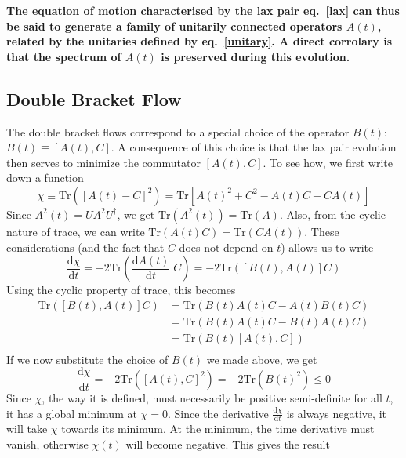 \documentclass[12pt,twoside]{article}
\numberwithin{equation}{section}
\begin{document}
{\textbf{The equation of motion characterised by the lax pair eq.~\ref{lax} can thus be said to generate a family of unitarily connected operators \(A(t)\), related by the unitaries defined by eq.~\ref{unitary}. A direct corrolary is that the spectrum of \(A(t)\) is preserved during this evolution.}
\subsection{Double Bracket Flow}
The double bracket flows correspond to a special choice of the operator \(B(t)\): \(B(t) \equiv \left[A(t), C\right]\). A consequence of this choice is that the lax pair evolution then serves to minimize the commutator \(\left[A(t), C\right]\). To see how, we first write down a function
\begin{equation}
	\label{minfunc}
	\chi \equiv \text{Tr}\left(\left[A(t) - C\right]^2\right) = \text{Tr}\left[A(t)^2 + C^2 - A(t) C - C A(t)\right]
\end{equation}
Since \(A^2(t) = U A^2 U^\dagger\), we get \(\text{Tr}(A^2(t)) = \text{Tr}(A)\). Also, from the cyclic nature of trace, we can write \(\text{Tr}(A(t)C)=\text{Tr}(CA(t))\). These considerations (and the fact that \(C\) does not depend on \(t\)) allows us to write
\begin{equation}
	\frac{\mathrm{d} \chi}{\mathrm{d}t} = -2\text{Tr}\left(\frac{\mathrm{d} A(t)}{\mathrm{d}t}\;C\right) = -2\text{Tr}\left(\left[B(t),A(t)\right] C\right)
\end{equation}
Using the cyclic property of trace, this becomes
\begin{equation}\begin{aligned}
	\text{Tr}\left(\left[B(t),A(t)\right] C\right) &= \text{Tr}\left(B(t)A(t) C - A(t) B(t)C\right)\\
						       &= \text{Tr}\left(B(t)A(t) C - B(t)A(t) C\right)\\
						       &= \text{Tr}\left(B(t)\left[A(t), C\right]\right)\\
\end{aligned}\end{equation}
If we now substitute the choice of \(B(t)\) we made above, we get
\begin{equation}
	\frac{\mathrm{d} \chi}{\mathrm{d}t} = -2\text{Tr}\left(\left[A(t), C\right]^2\right) = -2\text{Tr}\left(B(t)^2\right) \leq 0
\end{equation}
Since \(\chi\), the way it is defined, must necessarily be positive semi-definite for all \(t\), it has a global minimum at \(\chi = 0\). Since the derivative \(\frac{\mathrm{d} \chi}{\mathrm{d}t}\) is always negative, it will take \(\chi\) towards its minimum. At the minimum, the time derivative must vanish, otherwise \(\chi(t)\) will become negative. This gives the result
}
\end{document}
